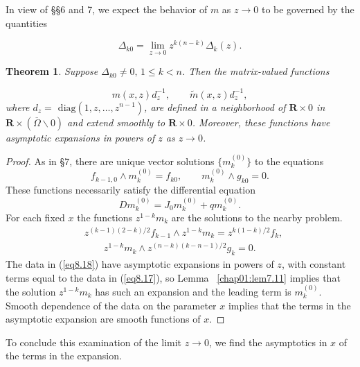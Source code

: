 \documentclass{surv-l}
\theoremstyle{plain}
\newtheorem{theorem}{Theorem}[section]
\theoremstyle{definition}
\numberwithin{equation}{chapter}
\begin{document}
In view of \S\S 6 and 7, we expect the behavior of $m$ as $z\rightarrow 0$ to be governed by the quantities

\begin{equation}\label{eq8.14}
\Delta_{k0}=\lim_{z\rightarrow 0}z^{k(n-k)}\Delta_{k}(z).
\end{equation}
\setcounter{theorem}{14}
\begin{theorem}\label{thm8.15}
Suppose $\Delta_{k0}\neq 0,\,1\leq k<n$. Then the matrix-valued functions

\begin{equation*}
m(x, z)d_{z}^{-1},\qquad \tilde{m}(x,z)d_{z}^{-1},
\end{equation*}
where $d_{z}=$ $\mathrm{diag}(1, z, \ldots, z^{n-1})$, are defined in a neighborhood of $\mathbf{R}\times 0$ in $\mathbf{R}\times (\overline{\Omega}\backslash 0)$ and extend smoothly to $\mathbf{R}\times 0$. Moreover, these functions have asymptotic expansions in powers of $z$ as $z\rightarrow 0$.
\end{theorem}
\begin{proof}
As in \S7, there are unique vector solutions $\{m_{k}^{(0)}\}$ to the equations
\setcounter{equation}{15}
\begin{equation}\label{eq8.16}
f_{k-1,0}\wedge m_{k}^{(0)}=f_{k0},\qquad m_{k}^{(0)}\wedge g_{k0}=0.
\end{equation}
These functions necessarily satisfy the differential equation
\begin{equation}\label{eq8.17}
Dm_{k}^{(0)}=J_{0}m_{k}^{(0)}+qm_{k}^{(0)}.
\end{equation}
For each fixed $x$ the functions $z^{1-k}m_{k}$ are the solutions to the nearby problem.
\begin{align}\label{eq8.18}
&z^{(k-1)(2-k)/2}f_{k-1}\wedge z^{1-k}m_{k}=z^{k(1-k)/2}f_{k},\\\nonumber
&\qquad z^{1-k}m_{k}\wedge z^{(n-k)(k-n-1)/2}g_{k}=0.
\end{align}
The data in (\ref{eq8.18}) have asymptotic expansions in powers of $z$, with constant terms equal to the data in (\ref{eq8.17}), so Lemma ~\ref{chap01:lem7.11} implies that the solution $z^{1-k}m_{k}$ has such an expansion and the leading term is $m_{k}^{(0)}$. Smooth dependence of the data on the parameter $x$ implies that the terms in the asymptotic expansion are smooth functions of $x$.
\end{proof}

To conclude this examination of the limit $z\rightarrow 0$, we find the asymptotics in $x$ of the terms in the expansion.
\end{document}
